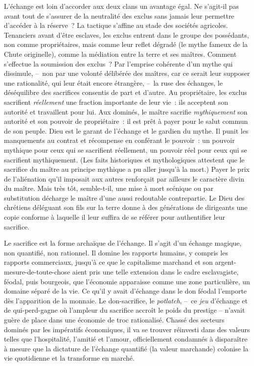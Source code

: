 \documentclass[french,twoside]{book} %
\begin{document}
L’échange est loin d’accorder aux deux clans un avantage égal. Ne s’agit-il pas avant tout de s’assurer de la neutralité des exclus sans jamais leur permettre d’accéder à la réserve ? La tactique s’affine au stade des sociétés agricoles. Tenanciers avant d’être esclaves, les exclus entrent dans le groupe des possédants, non comme propriétaires, mais comme leur reflet dégradé (le mythe fameux de la Chute originelle), comme la médiation entre la terre et ses maîtres. Comment s’effectue la soumission des exclus ? Par l’emprise cohérente d’un mythe qui dissimule, – non par une volonté délibérée des maîtres, car ce serait leur supposer une rationalité, qui leur était encore étrangère, – la ruse des échanges, le déséquilibre des sacrifices consentis de part et d’autre. Au propriétaire, les exclus sacrifient \emph{réellement} une fraction importante de leur vie : ils acceptent son autorité et travaillent pour lui. Aux dominés, le maître sacrifie \emph{mythiquement} son autorité et son pouvoir de propriétaire : il est prêt à payer pour le salut commun de son peuple. Dieu est le garant de l’échange et le gardien du mythe. Il punit les manquements au contrat et récompense en conférant le pouvoir : un pouvoir mythique pour ceux qui se sacrifient réellement, un pouvoir réel pour ceux qui se sacrifient mythiquement. (Les faits historiques et mythologiques attestent que le sacrifice du maître au principe mythique a pu aller jusqu’à la mort.) Payer le prix de l’aliénation qu’il imposait aux autres renforçait par ailleurs le caractère divin du maître. Mais très tôt, semble-t-il, une mise à mort scénique ou par substitution décharge le maître d’une aussi redoutable contrepartie. Le Dieu des chrétiens déléguant son fils sur la terre donne à des générations de dirigeants une copie conforme à laquelle il leur suffira de se référer pour authentifier leur sacrifice.\par
Le sacrifice est la forme archaïque de l’échange. Il s’agit d’un échange magique, non quantifié, non rationnel. Il domine les rapports humains, y compris les rapports commerciaux, jusqu’à ce que le capitalisme marchand et son argent-mesure-de-toute-chose aient pris une telle extension dans le cadre esclavagiste, féodal, puis bourgeois, que l’économie apparaisse comme une zone particulière, un domaine séparé de la vie. Ce qu’il y avait d’échange dans le don féodal l’emporte dès l’apparition de la monnaie. Le don-sacrifice, le \emph{potlatch}, – ce \emph{jeu} d’échange et de qui-perd-gagne où l’ampleur du sacrifice accroît le poids du prestige – n’avait guère de place dans une économie de troc rationalisé. Chassé des secteurs dominés par les impératifs économiques, il va se trouver réinvesti dans des valeurs telles que l’hospitalité, l’amitié et l’amour, officiellement condamnés à disparaître à mesure que la dictature de l’échange quantifié (la valeur marchande) colonise la vie quotidienne et la transforme en marché.\par
\end{document}
